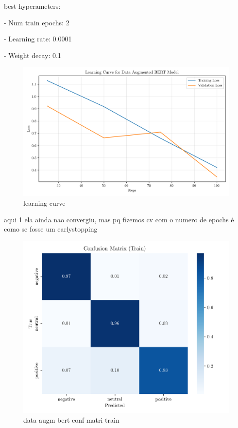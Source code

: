 \documentclass[conference]{IEEEtran}
\begin{document}
best hyperameters: 

- Num train epochs: 2

- Learning rate: 0.0001

- Weight decay: 0.1

\begin{figure}[H]
    \centering
    \includegraphics[width=1\linewidth]{assets/data_augmented_bert_learninc_curve.png}
    \caption{learning curve}
    \label{fig:data_augmented_bert_learninc_curve}
\end{figure}


aqui \ref{fig:data_augmented_bert_learninc_curve} ela ainda nao convergiu, mas pq fizemos cv com o numero de epochs é como se fosse um earlystopping

\begin{figure}[H]
    \centering
    \includegraphics[width=1\linewidth]{assets/dataaugmented_bert_confusion_matrix_Train.png}
    \caption{data augm bert conf matri train}
    \label{fig:dataaugmented_bert_confusion_matrix_Train}
\end{figure}
\end{document}
